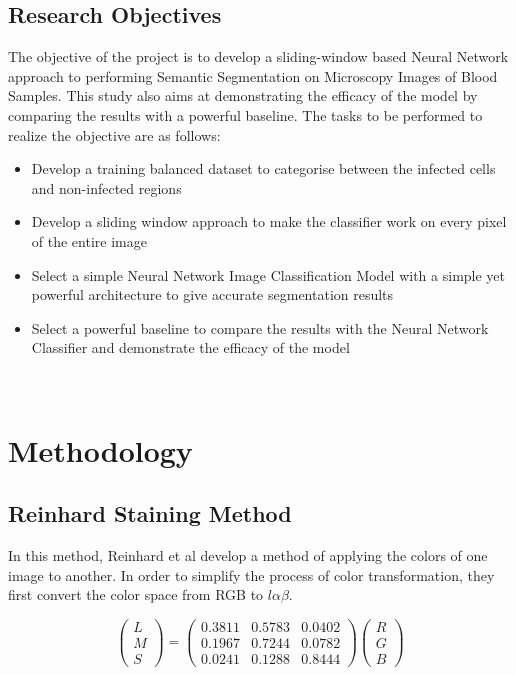 \documentclass{nitk}
\begin{document}
    \subsection{Research Objectives}
    
    {\hspace{20} The objective of the project is to develop a sliding-window based Neural Network approach to performing Semantic Segmentation on Microscopy Images of Blood Samples. This study also aims at demonstrating the efficacy of the model by comparing the results with a powerful baseline. The tasks to be performed to realize the objective are as follows:\\
    
    \begin{itemize}
        \item Develop a training balanced dataset to categorise between the infected cells and non-infected regions
        \item Develop a sliding window approach to make the classifier work on every pixel of the entire image
        \item Select a simple Neural Network Image Classification Model with a simple yet powerful architecture to give accurate segmentation results
        \item Select a powerful baseline to compare the results with the Neural Network Classifier and demonstrate the efficacy of the model
    \end{itemize}
   \\
   }
    \pagebreak
    
    \section{Methodology}

\subsection{Reinhard\cite{reinhard2001color} Staining Method}

In this method, Reinhard et al\cite{reinhard2001color} develop a method of applying the colors of one image to another. In order to simplify the process of color transformation, they first convert the color space from RGB to $l\alpha\beta$. 

\begin{equation}
    \begin{pmatrix} L \\ M \\ S \end{pmatrix} = 
    \begin{pmatrix} 0.3811 & 0.5783 & 0.0402 \\ 0.1967 & 0.7244 & 0.0782 \\ 0.0241 & 0.1288 & 0.8444 \end{pmatrix}
    \begin{pmatrix} R \\ G \\ B \end{pmatrix}
\end{equation}
\end{document}
